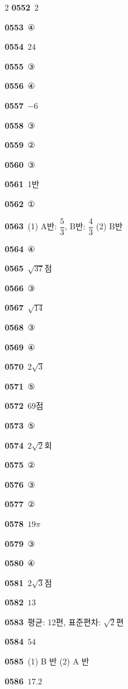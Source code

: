\documentclass[10pt,a4paper]{article}
\newcommand{\pt}[1]{\mathrm{#1}}
\begin{document}
\begin{multicols}{2}
\noindent\textbf{0552}\ $2$\par
\noindent\textbf{0553}\ ④\par
\noindent\textbf{0554}\ $24$\par
\noindent\textbf{0555}\ ③\par
\noindent\textbf{0556}\ ④\par
\noindent\textbf{0557}\ $-6$\par
\noindent\textbf{0558}\ ③\par
\noindent\textbf{0559}\ ②\par
\noindent\textbf{0560}\ ③\par
\noindent\textbf{0561}\ 1반\par
\noindent\textbf{0562}\ ①\par
\noindent\textbf{0563}\ (1) $\pt{A}$반: $\dfrac{5}{3}$, $\pt{B}$반: $\dfrac{4}{3}$ (2) $\pt{B}$반\par
\noindent\textbf{0564}\ ④\par
\noindent\textbf{0565}\ $\sqrt{37}$점\par
\noindent\textbf{0566}\ ③\par
\noindent\textbf{0567}\ $\sqrt{14}$\par
\noindent\textbf{0568}\ ③\par
\noindent\textbf{0569}\ ④\par
\noindent\textbf{0570}\ $2\sqrt{3}$\par
\noindent\textbf{0571}\ ⑤\par
\noindent\textbf{0572}\ 69점\par
\noindent\textbf{0573}\ ⑤\par
\noindent\textbf{0574}\ $2\sqrt{2}$회\par
\noindent\textbf{0575}\ ②\par
\noindent\textbf{0576}\ ③\par
\noindent\textbf{0577}\ ②\par
\noindent\textbf{0578}\ $19\pi$\par
\noindent\textbf{0579}\ ③\par
\noindent\textbf{0580}\ ④\par
\noindent\textbf{0581}\ $2\sqrt{3}$점\par
\noindent\textbf{0582}\ $13$\par
\noindent\textbf{0583}\ 평균: 12편, 표준편차: $\sqrt{2}$편\par
\noindent\textbf{0584}\ $54$\par
\noindent\textbf{0585}\ (1) B 반 (2) A 반\par
\noindent\textbf{0586}\ $17.2$\par

\end{multicols}
\end{document}
